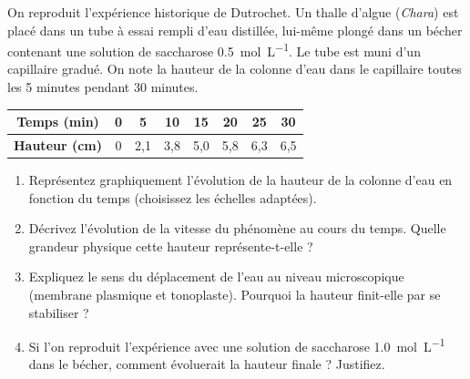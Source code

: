 \documentclass[11pt]{article}
\begin{document}
\begin{exercice}
On reproduit l'expérience historique de Dutrochet. Un thalle d'algue (\textit{Chara}) est placé dans un tube à essai rempli d'eau distillée, lui-même plongé dans un bécher contenant une solution de saccharose \SI{0,5}{\mole\per\liter}. Le tube est muni d'un capillaire gradué. On note la hauteur de la colonne d'eau dans le capillaire toutes les 5 minutes pendant 30 minutes.
\begin{center}
\begin{tabular}{|c|c|c|c|c|c|c|c|}
\hline
\textbf{Temps (min)} & 0 & 5 & 10 & 15 & 20 & 25 & 30 \\
\hline
\textbf{Hauteur (cm)} & 0 & 2,1 & 3,8 & 5,0 & 5,8 & 6,3 & 6,5 \\
\hline
\end{tabular}
\end{center}
\begin{enumerate}
    \item Représentez graphiquement l'évolution de la hauteur de la colonne d'eau en fonction du temps (choisissez les échelles adaptées).
    \item Décrivez l'évolution de la vitesse du phénomène au cours du temps. Quelle grandeur physique cette hauteur représente-t-elle ?
    \item Expliquez le sens du déplacement de l'eau au niveau microscopique (membrane plasmique et tonoplaste). Pourquoi la hauteur finit-elle par se stabiliser ?
    \item Si l'on reproduit l'expérience avec une solution de saccharose \SI{1,0}{\mole\per\liter} dans le bécher, comment évoluerait la hauteur finale ? Justifiez.
\end{enumerate}
\end{exercice}
\end{document}
